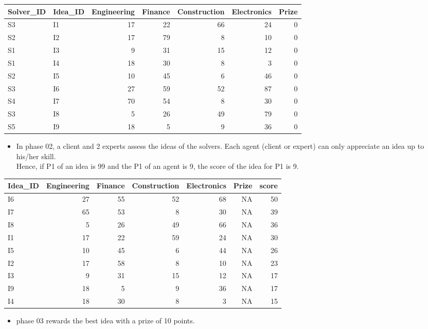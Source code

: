 \documentclass[]{elsarticle} %
\providecommand{\tightlist}{%
  \setlength{\itemsep}{0pt}\setlength{\parskip}{0pt}}
\begin{document}
\begin{tabular}{l|l|r|r|r|r|r}
\hline
Solver\_ID & Idea\_ID & Engineering & Finance & Construction & Electronics & Prize\\
\hline
S3 & I1 & 17 & 22 & 66 & 24 & 0\\
\hline
S2 & I2 & 17 & 79 & 8 & 10 & 0\\
\hline
S1 & I3 & 9 & 31 & 15 & 12 & 0\\
\hline
S1 & I4 & 18 & 30 & 8 & 3 & 0\\
\hline
S2 & I5 & 10 & 45 & 6 & 46 & 0\\
\hline
S3 & I6 & 27 & 59 & 52 & 87 & 0\\
\hline
S4 & I7 & 70 & 54 & 8 & 30 & 0\\
\hline
S3 & I8 & 5 & 26 & 49 & 79 & 0\\
\hline
S5 & I9 & 18 & 5 & 9 & 36 & 0\\
\hline
\end{tabular}

\begin{itemize}
\tightlist
\item
  In phase 02, a client and 2 experts assess the ideas of the solvers.
  Each agent (client or expert) can only appreciate an idea up to
  his/her skill.\\
  Hence, if P1 of an idea is 99 and the P1 of an agent is 9, the score
  of the idea for P1 is 9.
\end{itemize}

\begin{tabular}{l|r|r|r|r|r|r}
\hline
Idea\_ID & Engineering & Finance & Construction & Electronics & Prize & score\\
\hline
I6 & 27 & 55 & 52 & 68 & NA & 50\\
\hline
I7 & 65 & 53 & 8 & 30 & NA & 39\\
\hline
I8 & 5 & 26 & 49 & 66 & NA & 36\\
\hline
I1 & 17 & 22 & 59 & 24 & NA & 30\\
\hline
I5 & 10 & 45 & 6 & 44 & NA & 26\\
\hline
I2 & 17 & 58 & 8 & 10 & NA & 23\\
\hline
I3 & 9 & 31 & 15 & 12 & NA & 17\\
\hline
I9 & 18 & 5 & 9 & 36 & NA & 17\\
\hline
I4 & 18 & 30 & 8 & 3 & NA & 15\\
\hline
\end{tabular}

\begin{itemize}
\tightlist
\item
  phase 03 rewards the best idea with a prize of 10 points.
\end{itemize}
\end{document}
